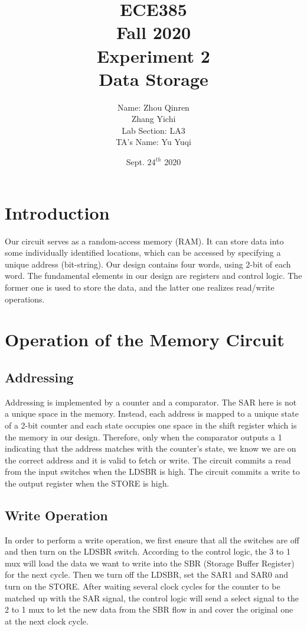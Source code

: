 \documentclass[12pt]{article}
\title{
    \textbf{\Huge ECE385} \\
    \huge Fall 2020 \\
    \huge Experiment 2 \\[120pt]
    \textbf{\Huge Data Storage} \\[120pt]
    }
\author{
    \large Name: Zhou Qinren \\ 
            \quad\qquad Zhang Yichi \\
    \large Lab Section: LA3 \\
    \large TA's Name: Yu Yuqi
    }
\date{Sept. $24^{th}$ 2020}
\begin{document}
\setlength{\parindent}{0pt}
\maketitle
\newpage

\section{Introduction}
Our circuit serves as a random-access memory (RAM). It can store data into some individually identified locations, which can be accessed by specifying a unique address (bit-string). Our design contains four words, using 2-bit of each word. The fundamental elements in our design are registers and control logic. The former one is used to store the data, and the latter one
realizes read/write operations.

\section{Operation of the Memory Circuit}
\subsection{\textbf{Addressing}}
Addressing is implemented by a counter and a comparator. The SAR here is not a unique space in the memory. Instead, each address is mapped to a unique state of a 2-bit counter and each state occupies one space in the shift register which is the memory in our design. Therefore, only when the comparator outputs a 1 indicating that the address matches with the counter's state, we know we are on the correct address and it is valid to fetch or write. The circuit commits a read from the input switches when the LDSBR is high. The circuit commits a write to the output register when the STORE is high.

\subsection{\textbf{Write Operation}}
In order to perform a write operation, we first ensure that all the switches are off and then turn on the LDSBR switch. According to the control logic, the 3 to 1 mux will load the data we want to write into the SBR (Storage Buffer Register) for the next cycle. Then we turn off the LDSBR, set the SAR1 and SAR0 and turn on the STORE. After waiting several clock cycles for the counter to be matched up with the SAR signal, the control logic will send a select signal to the 2 to 1 mux to let the new data from the SBR flow in and cover the original one at the next clock cycle.
\end{document}
